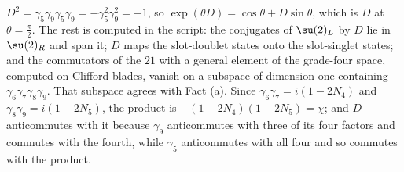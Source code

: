 $D^{2} = \gamma_{5}\gamma_{9}\gamma_{5}\gamma_{9} = -\gamma_{5}^{2}\gamma_{9}^{2} = -1$, so $\exp(\theta D) = \cos\theta + D\sin\theta$, which is $D$ at $\theta = \tfrac{\pi}{2}$. The rest is computed in the script: the conjugates of $\su(2)_{L}$ by $D$ lie in $\su(2)_{R}$ and span it; $D$ maps the slot-doublet states onto the slot-singlet states; and the commutators of the $21$ with a general element of the grade-four space, computed on Clifford blades, vanish on a subspace of dimension one containing $\gamma_{6}\gamma_{7}\gamma_{8}\gamma_{9}$. That subspace agrees with Fact (a). Since $\gamma_{6}\gamma_{7} = i(1 - 2N_{4})$ and $\gamma_{8}\gamma_{9} = i(1 - 2N_{5})$, the product is $-(1 - 2N_{4})(1 - 2N_{5}) = \chi$; and $D$ anticommutes with it because $\gamma_{9}$ anticommutes with three of its four factors and commutes with the fourth, while $\gamma_{5}$ anticommutes with all four and so commutes with the product.
